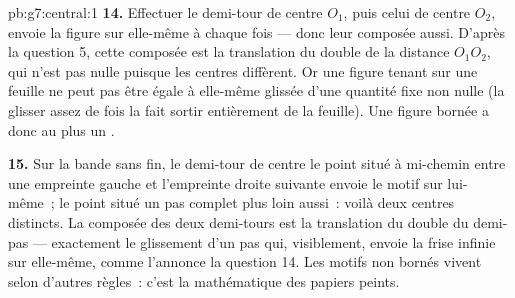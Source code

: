 \begin{solution}{pb:g7:central:1}
\textbf{14.} Effectuer le demi-tour de centre $O_1$, puis celui de
centre $O_2$, envoie la figure sur elle-même à chaque fois --- donc
leur composée aussi. D'après la question 5, cette composée est la
translation du double de la distance $O_1 O_2$, qui n'est pas nulle
puisque les centres diffèrent. Or une figure tenant sur une feuille
ne peut pas être égale à elle-même glissée d'une quantité fixe non
nulle (la glisser assez de fois la fait sortir entièrement de la
feuille). Une figure bornée a donc au plus un .

\textbf{15.} Sur la bande sans fin, le demi-tour de centre le point
situé à mi-chemin entre une empreinte gauche et l'empreinte droite
suivante envoie le motif sur lui-même~; le point situé un pas
complet plus loin aussi~: voilà deux centres distincts. La composée
des deux demi-tours est la translation du double du demi-pas ---
exactement le glissement d'un pas qui, visiblement, envoie la frise
infinie sur elle-même, comme l'annonce la question 14. Les motifs non
bornés vivent selon d'autres règles~: c'est la mathématique des
papiers peints.
\end{solution}
